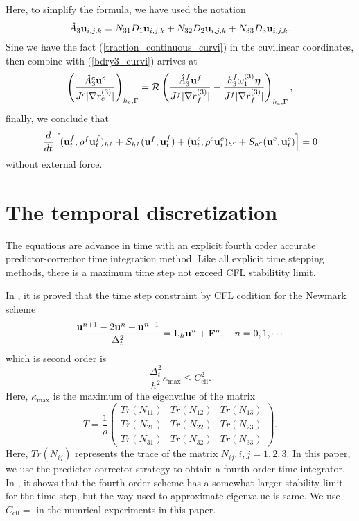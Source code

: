 \documentclass[a4paper]{article}
\begin{document}
Here, to simplify the formula,  we have used the notation
\begin{equation}\label{hatA}
\hat{A}_3{\bf u}_{i,j,k} = N_{31}D_1{\bf u}_{i,j,k} + N_{32}D_2{\bf u}_{i,j,k} + N_{33}D_3{\bf u}_{i,j,k}.
\end{equation}
Sine we have the fact (\ref{traction_continuous_curvi}) in the cuvilinear coordinates, then combine with (\ref{bdry3_curvi}) arrives at
\begin{equation*}
\left(\frac{\hat{A}_3^c{\bf u}^c}{J^c|\nabla r_c^{(3)}|}\right)_{h_c,\Gamma} = \mathcal{R}\left(\frac{\hat{A}_3^f{\bf u}^f}{J^f|\nabla r_f^{(3)}|} - \frac{h_3^f\omega_1^{(3)}{\bm \eta}}{J^f|\nabla r_f^{(3)}|}\right)_{h_c,\Gamma},
\end{equation*}
finally, we conclude that
\begin{equation*}
\frac{d}{dt}\left[({\bf u}_t^f,\rho^f {\bf u}_t^f)_{h^f} + S_{h^f}({\bf u}^f,{\bf u}^f_t) + ({\bf u}_t^c,\rho^c {\bf u}_t^c)_{h^c} + S_{h^c}({\bf u}^c,{\bf u}^c_t) \right]  = 0
\end{equation*}
without external force.

\section{The temporal discretization}
The equations are advance in time with an explicit fourth order accurate predictor-corrector time integration method. Like all explicit time stepping methods, there is a maximum time step not exceed CFL stabilitity limit.

In \cite{?}, it is proved that the time step constraint by CFL codition for the Newmark scheme 
\begin{equation*}
\frac{{\bf u}^{n+1}-2{\bf u}^n + {\bf u}^{n-1}}{\Delta_t^2} = {\bf L}_h{\bf u}^n + {\bf F}^n, \ \ \ n = 0,1,\cdots
\end{equation*}
 which is second order is
\begin{equation*}
\frac{\Delta_t^2}{h^2}\kappa_{\text{max}}\leq C_{\text{cfl}}^2.
\end{equation*}
Here, 
$\kappa_{\text{max}}$ is the maximum of the eigenvalue of the matrix 
\[T = \frac{1}{\rho}\left(\begin{array}{ccc}
Tr(N_{11}) &  Tr(N_{12})& Tr(N_{13})\\
Tr(N_{21}) & Tr(N_{22}) & Tr(N_{23})\\
Tr(N_{31}) & Tr(N_{32}) & Tr(N_{33})\end{array}\right). \]
Here, $Tr(N_{ij})$ represents the trace of the matrix $N_{ij},i,j = 1,2,3$. In this paper, we use the predictor-corrector strategy to obtain a fourth order time integrator. In \cite{?}, it shows that the fourth order scheme has a somewhat larger stability limit for the time step, but the way used to approximate eigenvalue is same. We use $C_{\text{cfl}} = $ in the numrical experiments in this paper.
\end{document}
